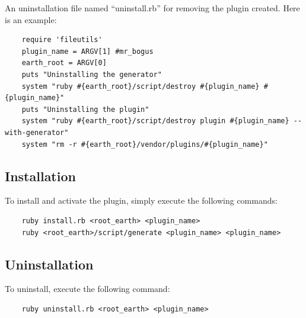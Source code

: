 \documentclass{article}
\begin{document}
\noindent 
An uninstallation file named ``uninstall.rb'' for removing the plugin created. Here is an example:

\begin{verbatim}
    require 'fileutils' 
    plugin_name = ARGV[1] #mr_bogus 
    earth_root = ARGV[0]  
    puts "Uninstalling the generator" 
    system "ruby #{earth_root}/script/destroy #{plugin_name} #{plugin_name}" 
    puts "Uninstalling the plugin" 
    system "ruby #{earth_root}/script/destroy plugin #{plugin_name} --with-generator" 
    system "rm -r #{earth_root}/vendor/plugins/#{plugin_name}"
\end{verbatim}


\subsection{Installation} %

\noindent
To install and activate the plugin, simply execute the following commands: 

\begin{verbatim}
    ruby install.rb <root_earth> <plugin_name>
    ruby <root_earth>/script/generate <plugin_name> <plugin_name>
\end{verbatim}


\subsection{Uninstallation} %

To uninstall, execute the following command:

\begin{verbatim}
    ruby uninstall.rb <root_earth> <plugin_name>
\end{verbatim}


\end{document}
